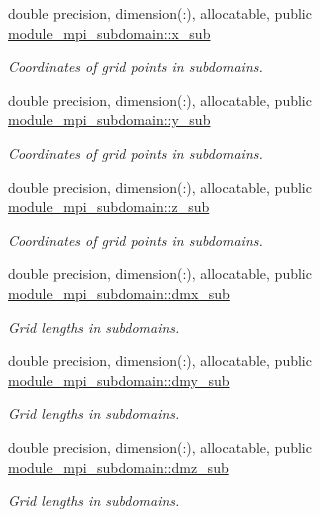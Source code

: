 \textbf{ }\par
\begin{DoxyCompactItemize}
\item 
double precision, dimension(\+:), allocatable, public \mbox{\hyperlink{namespacemodule__mpi__subdomain_a514fad372aeabc519f09899d384c90f4}{module\+\_\+mpi\+\_\+subdomain\+::x\+\_\+sub}}
\begin{DoxyCompactList}\small\item\em Coordinates of grid points in subdomains. \end{DoxyCompactList}\item 
double precision, dimension(\+:), allocatable, public \mbox{\hyperlink{namespacemodule__mpi__subdomain_ac39b52c6423a346d4697c47057631257}{module\+\_\+mpi\+\_\+subdomain\+::y\+\_\+sub}}
\begin{DoxyCompactList}\small\item\em Coordinates of grid points in subdomains. \end{DoxyCompactList}\item 
double precision, dimension(\+:), allocatable, public \mbox{\hyperlink{namespacemodule__mpi__subdomain_abd5356a51fd823d37ecc203933a8a3c6}{module\+\_\+mpi\+\_\+subdomain\+::z\+\_\+sub}}
\begin{DoxyCompactList}\small\item\em Coordinates of grid points in subdomains. \end{DoxyCompactList}\end{DoxyCompactItemize}

\textbf{ }\par
\begin{DoxyCompactItemize}
\item 
double precision, dimension(\+:), allocatable, public \mbox{\hyperlink{namespacemodule__mpi__subdomain_a0bd571c841b92676b5017401591b74b4}{module\+\_\+mpi\+\_\+subdomain\+::dmx\+\_\+sub}}
\begin{DoxyCompactList}\small\item\em Grid lengths in subdomains. \end{DoxyCompactList}\item 
double precision, dimension(\+:), allocatable, public \mbox{\hyperlink{namespacemodule__mpi__subdomain_a8b9835b45cf90a956b5b921507040c2d}{module\+\_\+mpi\+\_\+subdomain\+::dmy\+\_\+sub}}
\begin{DoxyCompactList}\small\item\em Grid lengths in subdomains. \end{DoxyCompactList}\item 
double precision, dimension(\+:), allocatable, public \mbox{\hyperlink{namespacemodule__mpi__subdomain_a9ffca06a0bb7f1ecf84d60e7679002fd}{module\+\_\+mpi\+\_\+subdomain\+::dmz\+\_\+sub}}
\begin{DoxyCompactList}\small\item\em Grid lengths in subdomains. \end{DoxyCompactList}\end{DoxyCompactItemize}

